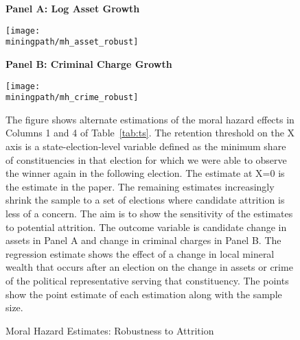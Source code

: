 \newpage
\begin{figure}[H]\caption{Moral Hazard Estimates: Robustness to Attrition}
  \begin{center}
    
    \small
    
    \textbf{Panel A: Log Asset Growth}
    
    \texttt{[image: \\miningpath/mh\_asset\_robust]}
    
    \label{fig:app_mh_attrition}

    \textbf{Panel B: Criminal Charge Growth}
    
    \texttt{[image: \\miningpath/mh\_crime\_robust]}
    
  \end{center}
  \footnotesize{The figure shows alternate estimations of the moral
    hazard effects in Columns 1 and 4 of Table~\ref{tab:ts}. The
    retention threshold on the X axis is a state-election-level variable
    defined as the minimum share of constituencies in that election for which
    we were able to observe the winner again in the following
    election. The estimate at X=0 is the estimate in the paper. The
    remaining estimates increasingly shrink the sample to a set of
    elections where candidate attrition is less of a concern. The aim
    is to show the sensitivity of the estimates to potential
    attrition. The outcome variable is candidate change in
    assets in Panel A and change in criminal charges in Panel B. The
    regression estimate shows the effect of a change in local mineral
    wealth that occurs after an election on the change in assets or
    crime of the political representative serving that
    constituency. The points show the point estimate of each
    estimation along with the sample size.
  }
\end{figure}  


